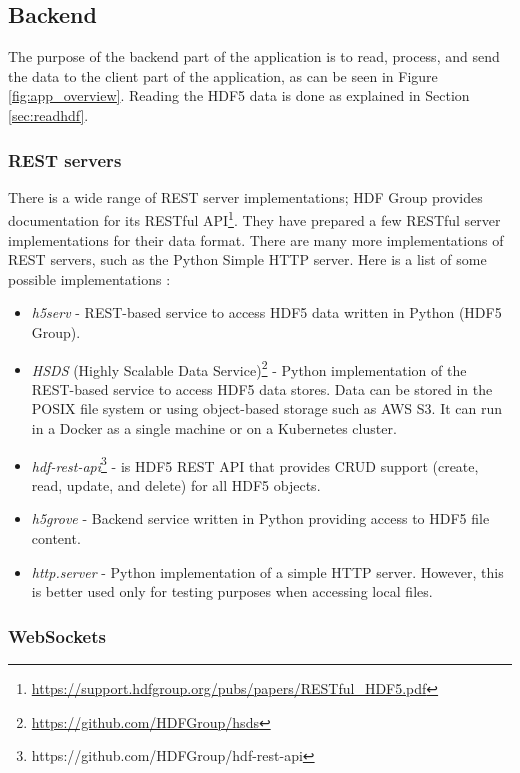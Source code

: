 \subsection{Backend}

The purpose of the backend part of the application is to read, process, and send the data to the client part of the application, as can be seen in Figure \ref{fig:app_overview}. Reading the HDF5 data is done as explained in Section \ref{sec:readhdf}.

\subsubsection{REST servers}

There is a wide range of REST server implementations; HDF Group provides documentation for its RESTful API\footnote{\url{https://support.hdfgroup.org/pubs/papers/RESTful\_HDF5.pdf}}. They have prepared a few RESTful server implementations for their data format. There are many more implementations of REST servers, such as the Python Simple HTTP server. Here is a list of some possible implementations \cite{hdfrest}:

\begin{itemize}
    \item \emph{h5serv} - REST-based service to access HDF5 data written in Python (HDF5 Group).
    \item \emph{HSDS} (Highly Scalable Data Service)\footnote{\url{https://github.com/HDFGroup/hsds}} - Python implementation of the REST-based service to access HDF5 data stores. Data can be stored in the POSIX file system or using object-based storage such as AWS S3. It can run in a Docker as a single machine or on a Kubernetes cluster.
    \item \emph{hdf-rest-api}\footnote{https://github.com/HDFGroup/hdf-rest-api} - is HDF5 REST API that provides CRUD support (create, read, update, and delete) for all HDF5 objects.
    \item \emph{h5grove} - Backend service written in Python providing access to HDF5 file content.
    \item \emph{http.server} - Python implementation of a simple HTTP server. However, this is better used only for testing purposes when accessing local files.
\end{itemize}

\subsubsection{WebSockets}

